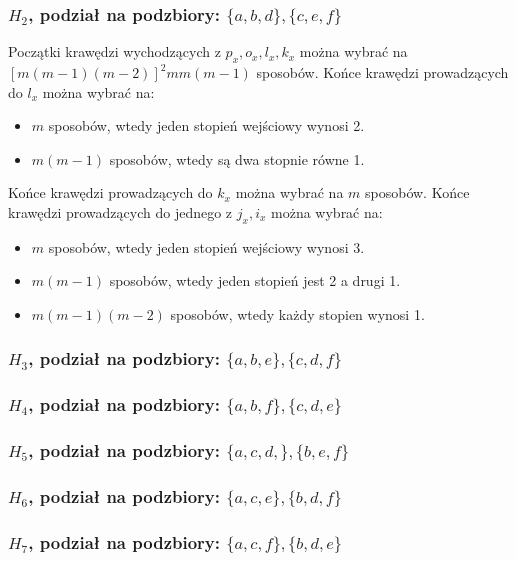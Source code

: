 \documentclass{article}
\begin{document}
\subsubsection{$H_2$, podział na podzbiory: $\{ a,b,d \}, \{ c,e,f \}$}
Początki krawędzi wychodzących z $p_x, o_x, l_x, k_x$ można wybrać na $[m(m-1)(m-2)]^2mm(m-1)$ sposobów.
Końce krawędzi prowadzących do $l_x$ można wybrać na:
\begin{itemize}
  \item $m$ sposobów, wtedy jeden stopień wejściowy wynosi 2.
  \item $m(m-1)$ sposobów, wtedy są dwa stopnie równe 1.
\end{itemize}
Końce krawędzi prowadzących do $k_x$ można wybrać na $m$ sposobów.
Końce krawędzi prowadzących do jednego z $j_x, i_x$ można wybrać na:
\begin{itemize}
  \item $m$ sposobów, wtedy jeden stopień wejściowy wynosi 3.
  \item $m(m-1)$ sposobów, wtedy jeden stopień jest 2 a drugi 1.
  \item $m(m-1)(m-2)$ sposobów, wtedy każdy stopien wynosi 1.
\end{itemize}

\subsubsection{$H_3$, podział na podzbiory: $\{ a,b,e \}, \{ c,d,f \}$}

\subsubsection{$H_4$, podział na podzbiory: $\{ a,b,f \}, \{ c,d,e \}$}

\subsubsection{$H_5$, podział na podzbiory: $\{ a,c,d, \}, \{ b,e,f \}$}

\subsubsection{$H_6$, podział na podzbiory: $\{ a,c,e \}, \{ b,d,f \}$}

\subsubsection{$H_7$, podział na podzbiory: $\{ a,c,f \}, \{ b,d,e \}$}
\end{document}
